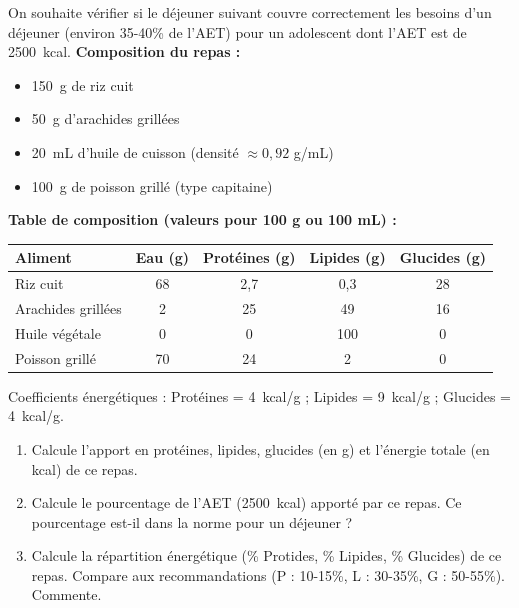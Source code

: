 \documentclass[11pt]{article}
\newcounter{popsec}
\newcounter{popsub}
\newcommand{\courssub}[1]{%
  \stepcounter{popsub}%
  \par\vspace{9pt}\noindent{\popxbold\fontsize{11.5}{13}\selectfont\color{popink}{\color{poporange}\thepopsec.\thepopsub}\hspace{6pt}#1}\par\nopagebreak\vspace{4pt}
}
\begin{document}
\courssub{Je m'entraîne}

\begin{exercice}
On souhaite vérifier si le déjeuner suivant couvre correctement les besoins d'un déjeuner (environ 35-40\% de l'AET) pour un adolescent dont l'AET est de \SI{2500}{kcal}.
\textbf{Composition du repas :}
\begin{itemize}
\item \SI{150}{g} de riz cuit
\item \SI{50}{g} d'arachides grillées
\item \SI{20}{mL} d'huile de cuisson (densité $\approx 0,92$ g/mL)
\item \SI{100}{g} de poisson grillé (type capitaine)
\end{itemize}
\textbf{Table de composition (valeurs pour 100 g ou 100 mL) :}
\begin{center}
\begin{tabular}{|l|c|c|c|c|}\hline
Aliment & Eau (g) & Protéines (g) & Lipides (g) & Glucides (g) \\ \hline
Riz cuit & 68 & 2,7 & 0,3 & 28 \\
Arachides grillées & 2 & 25 & 49 & 16 \\
Huile végétale & 0 & 0 & 100 & 0 \\
Poisson grillé & 70 & 24 & 2 & 0 \\ \hline
\end{tabular}
\end{center}
Coefficients énergétiques : Protéines = \SI{4}{kcal/g} ; Lipides = \SI{9}{kcal/g} ; Glucides = \SI{4}{kcal/g}.
\begin{enumerate}
\item Calcule l'apport en protéines, lipides, glucides (en g) et l'énergie totale (en kcal) de ce repas.
\item Calcule le pourcentage de l'AET (\SI{2500}{kcal}) apporté par ce repas. Ce pourcentage est-il dans la norme pour un déjeuner ?
\item Calcule la répartition énergétique (\% Protides, \% Lipides, \% Glucides) de ce repas. Compare aux recommandations (P : 10-15\%, L : 30-35\%, G : 50-55\%). Commente.
\end{enumerate}
\end{exercice}
\end{document}
